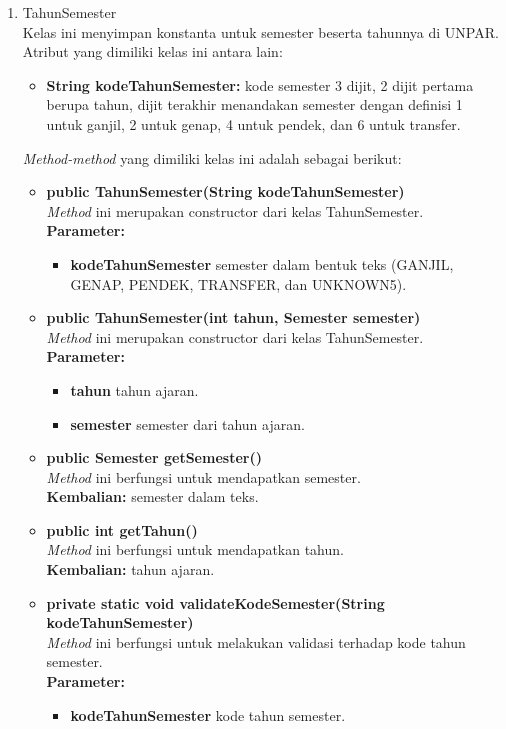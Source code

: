 \begin{enumerate}
\begin{enumerate}
		\item TahunSemester\\
		Kelas ini menyimpan konstanta untuk semester beserta tahunnya di UNPAR. Atribut yang dimiliki kelas ini antara lain:
		\begin{itemize}
			\item \textbf{String kodeTahunSemester:} kode semester 3 dijit, 2 dijit pertama berupa tahun, dijit terakhir menandakan semester dengan definisi 1 untuk ganjil, 2 untuk genap, 4 untuk pendek, dan 6 untuk transfer.
		\end{itemize}
		\textit{Method-method} yang dimiliki kelas ini adalah sebagai berikut:
		\begin{itemize}
			\item \textbf{public TahunSemester(String kodeTahunSemester)} \\
			\textit{Method} ini merupakan constructor dari kelas TahunSemester. \\
			\textbf{Parameter:}
			\begin{itemize}
				\item \textbf{kodeTahunSemester} semester dalam bentuk teks (GANJIL, GENAP, PENDEK, TRANSFER, dan UNKNOWN5).
			\end{itemize}
			
			\item \textbf{public TahunSemester(int tahun, Semester semester)} \\
			\textit{Method} ini merupakan constructor dari kelas TahunSemester. \\
			\textbf{Parameter:}
			\begin{itemize}
				\item \textbf{tahun} tahun ajaran.
				\item \textbf{semester} semester dari tahun ajaran.
			\end{itemize}
			
			\item \textbf{public Semester getSemester()} \\
			\textit{Method} ini berfungsi untuk mendapatkan semester. \\
			\textbf{Kembalian:} semester dalam teks.
			
			\item \textbf{public int getTahun()} \\
			\textit{Method} ini berfungsi untuk mendapatkan tahun. \\
			\textbf{Kembalian:} tahun ajaran.
			
			\item \textbf{private static void validateKodeSemester(String kodeTahunSemester)} \\
			\textit{Method} ini berfungsi untuk melakukan  validasi terhadap kode tahun semester. \\
			\textbf{Parameter:}
			\begin{itemize}
				\item \textbf{kodeTahunSemester} kode tahun semester.
			\end{itemize}
		\end{itemize}
	\end{enumerate}
	

\end{enumerate}
